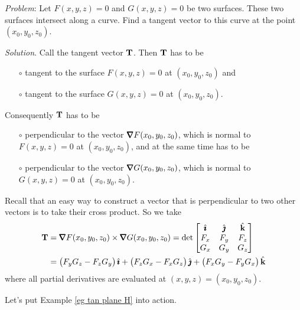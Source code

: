 \begin{eg}\label{eg tan plane H}
\noindent\textit{Problem}:
Let $F(x,y,z)=0$ and $G(x,y,z)=0$ be two surfaces. These two surfaces
intersect along a curve.
Find a tangent vector to this curve at the point $(x_0,y_0,z_0)$.

\medskip
\noindent\textit{Solution}.
Call the tangent vector $\mathbf{T}$. Then $\mathbf{T}$ has to be
\begin{itemize}\itemsep1pt \parskip0pt 
\item[$\circ$] 
tangent to the surface  $F(x,y,z)=0$ at $(x_0,y_0,z_0)$ and
\item[$\circ$] 
tangent to the surface  $G(x,y,z)=0$ at $(x_0,y_0,z_0)$.
\end{itemize}
Consequently $\mathbf{T}$ has to be 
\begin{itemize}\itemsep1pt \parskip0pt 
\item[$\circ$] 
perpendicular to the vector $\vnabla F(x_0,y_0,z_0)$, which is
normal to  $F(x,y,z)=0$ at $(x_0,y_0,z_0)$, and at the same time has to be
\item[$\circ$] 
perpendicular to the vector $\vnabla G(x_0,y_0,z_0)$, which is
normal to  $G(x,y,z)=0$ at $(x_0,y_0,z_0)$.
\end{itemize}
Recall that an easy way to construct a vector that is perpendicular to
two other vectors is to take their cross product. So we take
\begin{align*}
\vT &= \vnabla F(x_0,y_0,z_0)\times \vnabla G(x_0,y_0,z_0)
    =\det\left[\begin{matrix}
                 \hi & \hj & \hk \\
                 F_x & F_y & F_z \\
                 G_x & G_y & G_z \end{matrix}\right] \\
& =\big(F_yG_z-F_z G_y\big)\,\hi + \big(F_zG_x-F_x G_z\big)\,\hj
    +\big(F_xG_y-F_y G_x\big)\,\hk
\end{align*}
where all partial derivatives are evaluated at $(x,y,z)=(x_0,y_0,z_0)$.

\end{eg}

Let's put Example \ref{eg tan plane H} into action.


